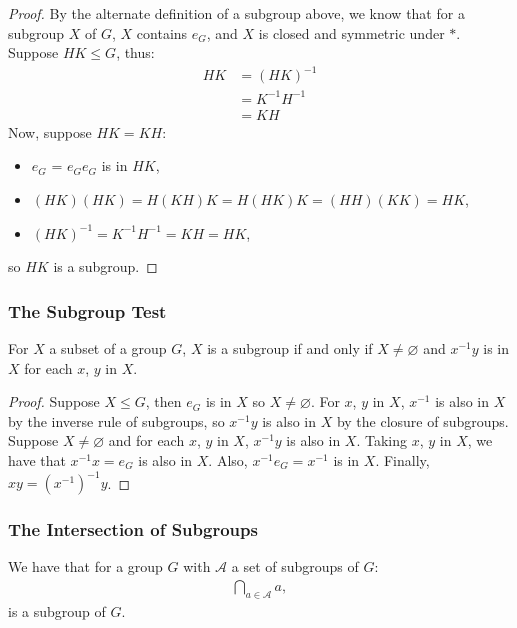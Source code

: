 \begin{proof}
    By the alternate definition of a subgroup above, we know that for a subgroup
    $X$ of $G$, $X$ contains $e_G$, and $X$ is closed and symmetric under $\ast$.
    \\[\baselineskip]
    Suppose $HK \leq G$, thus: \begin{align*}
        HK &= (HK)^{-1} \\
        &= K^{-1}H^{-1} \\
        &= KH
    \end{align*} Now, suppose $HK = KH$: \begin{itemize}
        \item $e_G$ = $e_Ge_G$ is in $HK$,
        \item $(HK)(HK) = H(KH)K = H(HK)K = (HH)(KK) = HK$,
        \item $(HK)^{-1} = K^{-1}H^{-1} = KH = HK$,
    \end{itemize} so $HK$ is a subgroup.
\end{proof}

\subsubsection{The Subgroup Test}

For $X$ a subset of a group $G$, $X$ is a subgroup if and only if $X \neq \varnothing$
and $x^{-1}y$ is in $X$ for each $x$, $y$ in $X$.

\begin{proof}
    Suppose $X \leq G$, then $e_G$ is in $X$ so $X \neq \varnothing$. For $x$, $y$ in $X$,
    $x^{-1}$ is also in $X$ by the inverse rule of subgroups, so $x^{-1}y$ is also
    in $X$ by the closure of subgroups.
    \\[\baselineskip]
    Suppose $X \neq \varnothing$ and for each $x$, $y$ in $X$, $x^{-1}y$ is also in $X$.
    Taking $x$, $y$ in $X$, we have that $x^{-1}x = e_G$ is also in $X$. 
    Also, $x^{-1}e_G = x^{-1}$ is in $X$. Finally, $xy = (x^{-1})^{-1}y$.
\end{proof}

\subsubsection{The Intersection of Subgroups}

We have that for a group $G$ with $\mathcal{A}$ a set of subgroups of $G$: \begin{align*}
    \bigcap_{a \in \mathcal{A}} a,
\end{align*} is a subgroup of $G$.

